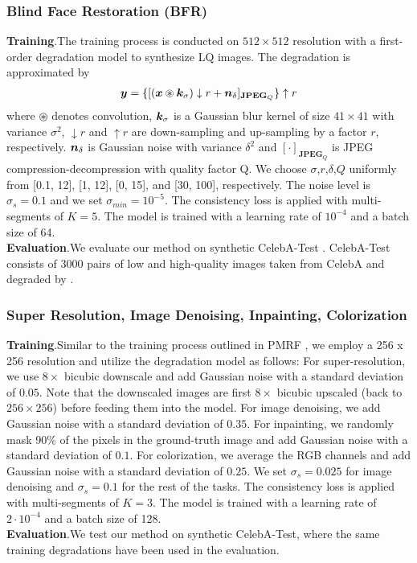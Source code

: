 \subsubsection{Blind Face Restoration (BFR)}\label{bfr_imp}
\textbf{Training}.\quad The training process is conducted on $512\times512$ resolution with a first-order degradation model to synthesize LQ images. The degradation \cite{zhang2021designing} is approximated by
\begin{align}\label{degradation}
\bm{y}=\{[(\bm{x} \circledast \bm{k}_\sigma)\downarrow r+\bm{n}_\delta]_{\mathbf{JPEG}_{Q}}\}\uparrow r
\end{align}
where $\circledast$ denotes convolution, $\bm{k}_\sigma$ is a Gaussian blur kernel of size $41 \times 41$ with variance $\sigma^2$, $\downarrow r$ and $\uparrow r$ are down-sampling and up-sampling by a factor $r$, respectively. $\bm{n}_\delta$ is Gaussian noise with variance $\delta^2$ and $[\cdot]_{\mathbf{JPEG}_{Q}}$ is JPEG compression-decompression with quality factor Q. We choose $\sigma$,$r$,$\delta$,$Q$ uniformly from [0.1, 12], [1, 12], [0, 15], and [30, 100], respectively. The noise level is $\sigma_s=0.1$ and we set $\sigma_{min}=10^{-5}$. The consistency loss is applied with multi-segments \cite{yang2024consistencyfm} of $K=5$. The model is trained with a learning rate of $10^{-4}$ and a batch size of 64.
\\
\textbf{Evaluation}.\quad We evaluate our method on synthetic CelebA-Test \cite{liu2015faceattributes}. CelebA-Test consists of 3000 pairs of low and high-quality images taken from CelebA and degraded by \citet{wang2021towards}. 


\subsubsection{Super Resolution, Image Denoising, Inpainting, Colorization}\label{tasks_imp}
\textbf{Training}.\quad Similar to the training process outlined in PMRF \cite{ohayon2024posterior}, we employ a 256 x 256 resolution and utilize the degradation model as follows: For super-resolution, we use $8\times$ bicubic downscale and add Gaussian noise with a standard deviation of $0.05$. Note that the downscaled images are first $8\times$ bicubic upscaled (back to $256\times256$) before feeding them into the model. For image denoising, we add Gaussian noise with a standard deviation of $0.35$. For inpainting, we randomly mask 90\% of the pixels in the ground-truth image and add Gaussian noise with a standard deviation of $0.1$. For colorization, we average the RGB channels and add Gaussian noise with a standard deviation of $0.25$. We set $\sigma_s=0.025$ for image denoising and $\sigma_s=0.1$ for the rest of the tasks. The consistency loss is applied with multi-segments \cite{yang2024consistencyfm} of $K=3$. The model is trained with a learning rate of $2\cdot10^{-4}$ and a batch size of 128.
\\
\textbf{Evaluation}.\quad We test our method on synthetic CelebA-Test, where the same training degradations have been used in the evaluation.


